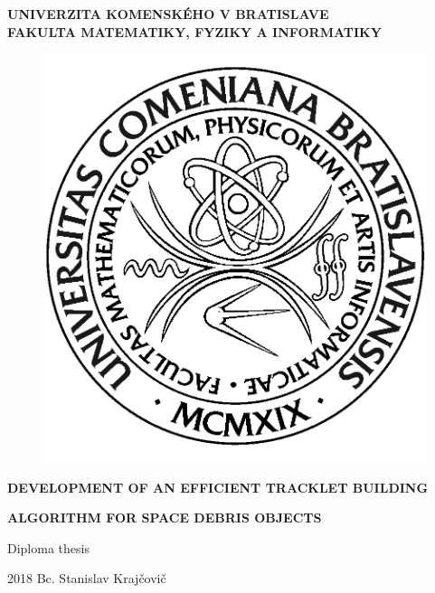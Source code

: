 \documentclass[12pt, a4paper, oneside]{book}
\newcommand{\mfthesistype}{Diploma thesis}
\newcommand{\mfauthor}{Bc. Stanislav Krajčovič}
\newcommand{\mfuniversity}{UNIVERZITA KOMENSKÉHO V BRATISLAVE}
\newcommand{\mffaculty}{FAKULTA MATEMATIKY, FYZIKY A INFORMATIKY}
\begin{document}
\frontmatter

\thispagestyle{empty}

\noindent
\begin{minipage}{\textwidth}
\begin{center}
\textbf{\mfuniversity \\
\mffaculty}
\end{center}
\end{minipage}

\vfill
\begin{figure}[!hbt]
	\begin{center}
		\includegraphics{images/logo_fmph}
		\label{img:logo}
	\end{center}
\end{figure}
\begin{center}
	\begin{minipage}{0.8\textwidth}
		\centerline{\textbf{\Large\MakeUppercase{Development of an efficient tracklet building }}}
		\smallskip
		\centerline{\textbf{\Large\MakeUppercase{algorithm for space debris objects}}}
		\smallskip
		\centerline{\mfthesistype}
	\end{minipage}
\end{center}
\vfill
2018 \hfill
\mfauthor
\eject 
\end{document}
